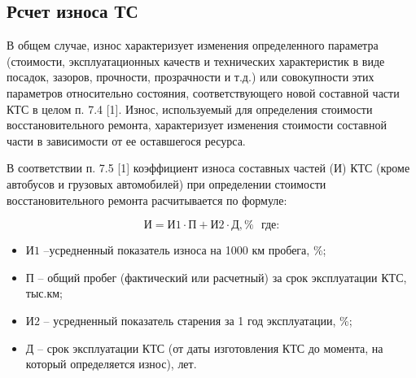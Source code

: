 %
%
%
%
%

\subsection{Рсчет износа ТС }

В общем случае, износ характеризует изменения определенного параметра (стоимости, эксплуатационных качеств и технических характеристик в виде посадок, зазоров, прочности, прозрачности и т.д.) или совокупности этих параметров относительно состояния, соответствующего новой составной части КТС в целом п. 7.4 [1]. Износ, используемый для определения стоимости восстановительного ремонта, характеризует изменения стоимости составной части в зависимости от ее оставшегося ресурса.



В соответствии п. 7.5 [1] коэффициент износа составных частей (И) КТС (кроме автобусов и грузовых автомобилей) при определении стоимости восстановительного ремонта расчитывается по формуле:

\begin{equation}\label{eqsnos}
\text{И} =\text{И1}\cdot\text{П}+\text{И2}\cdot \text{Д}, \%  \,\,\,\, \text{где:}
\end{equation}

\begin{itemize}
	\item [] $ \text{И1} $ --усредненный показатель износа на 1000 км пробега, \%; 
	\item [] $ \text{П} $ -- общий пробег (фактический или расчетный) за срок эксплуатации КТС, тыс.км;
	\item [] $ \text{И2} $ -- усредненный показатель старения за 1 год эксплуатации, \%;
	\item [] $ \text{Д} $ -- срок эксплуатации КТС (от даты изготовления КТС до момента, на который определяется износ), лет. 
\end{itemize}



